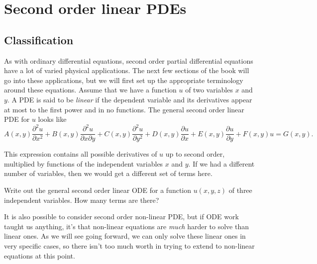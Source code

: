 
\section{Second order linear PDEs}
\label{secondpde:section}



\subsection{Classification}

As with ordinary differential equations, second order partial differential equations have a lot of varied physical applications. The next few sections of the book will go into these applications, but we will first set up the appropriate terminology around these equations. Assume that we have a function $u$ of two variables $x$ and $y$. A PDE is said to be \emph{linear} if the dependent
variable and its derivatives appear at most to the first power and in no
functions. The general second order linear PDE for $u$ looks like
\[ A(x,y)\frac{\partial^2 u}{\partial x^2} + B(x,y) \frac{\partial^2u}{\partial x \partial y} + C(x,y) \frac{\partial ^2 u}{\partial y^2} + D(x,y) \frac{\partial u}{\partial x} + E(x,y) \frac{\partial u}{\partial y} + F(x,y) u = G(x,y). \]

This expression contains all possible derivatives of $u$ up to second order, multiplied by functions of the independent variables $x$ and $y$. If we had a different number of variables, then we would get a different set of terms here.

\begin{exercise}
Write out the general second order linear ODE for a function $u(x,y,z)$ of three independent variables. How many terms are there?
\end{exercise}

It is also possible to consider second order non-linear PDE, but if ODE work taught us anything, it's that non-linear equations are \emph{much} harder to solve than linear ones. As we will see going forward, we can only solve these linear ones in very specific cases, so there isn't too much worth in trying to extend to non-linear equations at this point.

